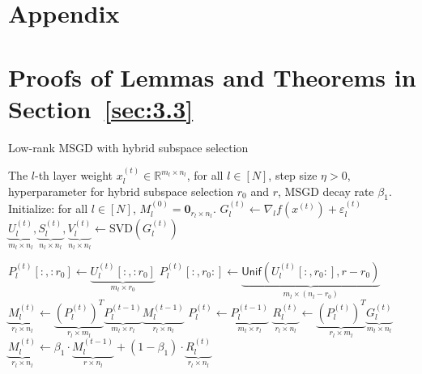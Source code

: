 


\section*{Appendix}


\section{Proofs of Lemmas and Theorems in Section~\ref{sec:3.3}
\label{sec:proofs_our_method_guarantee}}


\begin{algorithm*}[!ht]
   \caption{Low-rank MSGD with hybrid subspace selection}
   \label{alg:theory_algorithm}
 \begin{algorithmic}[1]
    The $l$-th layer weight $x_l^{(t)} \in \mathbb{R}^{m_l\times n_l}$, for all $l \in [N]$, step size $\eta > 0$, hyperparameter for hybrid subspace selection $r_0$ and $r$, MSGD decay rate $\beta_1$.
   \STATE Initialize: for all $l \in [N]$, $M_l^{(0)}=\mathbf{0}_{r_l\times n_l}$. 
   \STATE $G_l^{(t)} \gets \nabla_l f(x^{(t)}) + \varepsilon_l^{(t)} $ \hfill {}
   \STATE $\underbrace{U_l^{(t)}}_{m_l \times n_l}, \underbrace{S_l^{(t)}}_{n_l \times n_l}, \underbrace{V_l^{(t)}}_{n_l \times n_l} \gets \text{SVD}(G_l^{(t)})$
   
   \STATE $P_l^{(t)}[:,:r_0] \gets \underbrace{U_l^{(t)}[:, :r_0]}_{m_l \times r_0}$ \hfill {}
   \STATE $P_l^{(t)}[:,r_0:] \gets \underbrace{\mathsf{Unif}(U_l^{(t)}[:, r_0:], r-r_0)}_{m_l \times (n_l - r_0)}$ \hfill {}
   \STATE $\underbrace{M_l^{(t)}}_{r_l\times n_l} \gets \underbrace{(P_l^{(t)})^T}_{r_l \times m_l} \underbrace{P_l^{(t-1)}}_{m_l \times r_l} \underbrace{M_l^{(t-1)}}_{r_l\times n_l}$ \hfill {}
   \ELSE
   \STATE $P_l^{(t)} \gets \underbrace{P_l^{(t-1)}}_{m_l \times r_l}$ \hfill {}
   \ENDIF
   \STATE $\underbrace{R_l^{(t)}}_{r_l \times n_l} \gets \underbrace{(P_l^{(t)})^{T}}_{r_l \times m_l} \underbrace{G_l^{(t)}}_{m_l \times n_l}$ \hfill {}
   \STATE $\underbrace{M_l^{(t)}}_{r_l \times n_l} \gets \beta_{1} \cdot \underbrace{M_l^{(t-1)}}_{r \times n_l} + (1 - \beta_{1}) \cdot \underbrace{R_l^{(t)}}_{r_l \times n_l}$ \hfill {}
   

\end{algorithmic}
\end{algorithm*}
